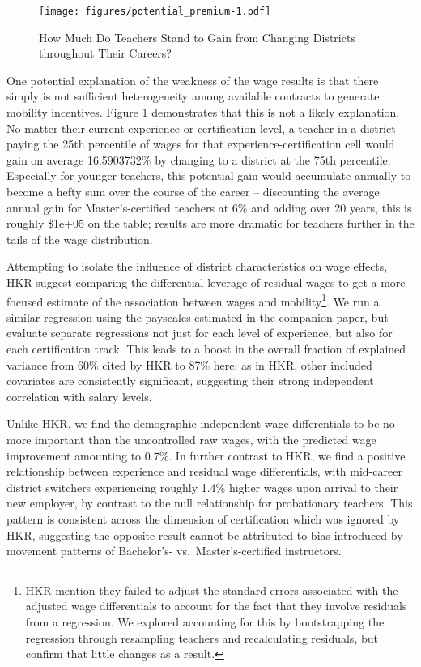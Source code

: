 \documentclass[12pt,]{article}
\let\rmarkdownfootnote\footnote%
\def\footnote{\protect\rmarkdownfootnote}
\begin{document}
\begin{figure}[htbp]
\centering
\texttt{[image: figures/potential\_premium-1.pdf]}
\caption{\label{fig:premia}How Much Do Teachers Stand to Gain from
Changing Districts throughout Their Careers?}
\end{figure}

One potential explanation of the weakness of the wage results is that
there simply is not sufficient heterogeneity among available contracts
to generate mobility incentives. Figure \ref{fig:premia} demonstrates
that this is not a likely explanation. No matter their current
experience or certification level, a teacher in a district paying the
25th percentile of wages for that experience-certification cell would
gain on average 16.5903732\% by changing to a district at the 75th
percentile. Especially for younger teachers, this potential gain would
accumulate annually to become a hefty sum over the course of the career
-- discounting the average annual gain for Master's-certified teachers
at 6\% and adding over 20 years, this is roughly \$1e+05 on the table;
results are more dramatic for teachers further in the tails of the wage
distribution.

Attempting to isolate the influence of district characteristics on wage
effects, HKR suggest comparing the differential leverage of residual
wages to get a more focused estimate of the association between wages
and mobility\footnote{HKR mention they failed to adjust the standard
  errors associated with the adjusted wage differentials to account for
  the fact that they involve residuals from a regression. We explored
  accounting for this by bootstrapping the regression through resampling
  teachers and recalculating residuals, but confirm that little changes
  as a result.}. We run a similar regression using the payscales
estimated in the companion paper, but evaluate separate regressions not
just for each level of experience, but also for each certification
track. This leads to a boost in the overall fraction of explained
variance from 60\% cited by HKR to 87\% here; as in HKR, other included
covariates are consistently significant, suggesting their strong
independent correlation with salary levels.

Unlike HKR, we find the demographic-independent wage differentials to be
no more important than the uncontrolled raw wages, with the predicted
wage improvement amounting to 0.7\%. In further contrast to HKR, we find
a positive relationship between experience and residual wage
differentials, with mid-career district switchers experiencing roughly
1.4\% higher wages upon arrival to their new employer, by contrast to
the null relationship for probationary teachers. This pattern is
consistent across the dimension of certification which was ignored by
HKR, suggesting the opposite result cannot be attributed to bias
introduced by movement patterns of Bachelor's- vs.~Master's-certified
instructors.
\end{document}
